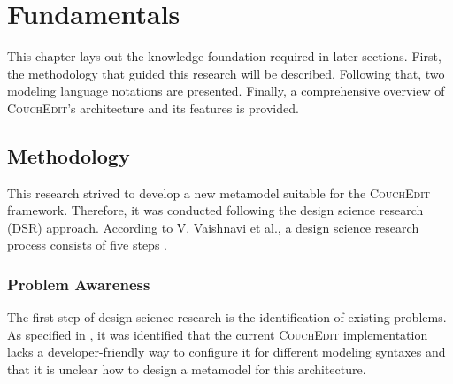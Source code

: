 \chapter{Fundamentals}
\label{ch:fundamentals}

This chapter lays out the knowledge foundation required in later sections. First, the methodology that guided this research will be described. Following that, two modeling language notations are presented. Finally, a comprehensive overview of \textsc{CouchEdit}'s architecture and its features is provided. 




\section{Methodology}
This research strived to develop a new metamodel suitable for the \textsc{CouchEdit} framework. Therefore, it was conducted following the design science research (DSR) approach. According to V. Vaishnavi et al., a design science research process consists of five steps \cite{vaishnavi_design_2004}.

\subsection{Problem Awareness}
The first step of design science research is the identification of existing problems. As specified in , it was identified that the current \textsc{CouchEdit} implementation lacks a developer-friendly way to configure it for different modeling syntaxes and that it is unclear how to design a metamodel for this architecture.

